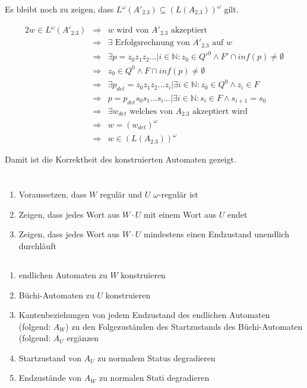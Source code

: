 \documentclass[10pt,a4paper,oneside,ngerman,numbers=noenddot]{scrartcl}
\begin{document}
	Es bleibt noch zu zeigen, dass \(L^{\omega}(A'_{2.3}) \subseteq (L(A_{2.3}))^{\omega}\) gilt.
	
	\begin{alignat*}{2}
		w \in L^{\omega}(A'_{2.3}) &\Rightarrow & w \text{ wird von \(A'_{2.3}\) akzeptiert} \\
									&\Rightarrow & \exists \text{ Erfolgsrechnung von \(A'_{2.3}\) auf \(w\)} \\
									&\Rightarrow & \exists p = z_{0}z_{1}z_{2}... | i \in \mathbb{N} : z_{0} \in Q'^{0} \wedge F' \cap inf(p) \neq \emptyset \\
									&\Rightarrow & z_{0} \in Q^{0} \wedge F \cap inf(p) \neq \emptyset \\
									&\Rightarrow & \exists p_{det} = z_{0}z_{1}z_{2}...z_{i} | \exists i \in \mathbb{N} : z_{0} \in Q^{0} \wedge z_{i} \in F \\
									&\Rightarrow & p = p_{det}s_{0}s_{1}...s_{i}... | \exists i \in \mathbb{N} : s_{i} \in F \wedge s_{i+1} = s_{0} \\
									&\Rightarrow & \exists w_{det} \text{ welches von \(A_{2.3}\) akzeptiert wird} \\
									&\Rightarrow & w = (w_{det})^{\omega} \\
									&\Rightarrow & w \in (L(A_{2.3}))^{\omega}
	\end{alignat*}
	
	Damit ist die Korrektheit des konstruierten Automaten gezeigt.
	
\section{} %
	\subsection{} %
		\begin{enumerate}
			\item Voraussetzen, dass \(W\) regulär und \(U\) \(\omega\)-regulär ist
			\item Zeigen, dass jedes Wort aus \(W \cdot U\) mit einem Wort aus \(U\) endet
			\item Zeigen, dass jedes Wort aus \(W \cdot U\) mindestens einen Endzustand unendlich durchläuft
		\end{enumerate}
	\subsection{} %
		\begin{enumerate}
			\item endlichen Automaten zu \(W\) konstruieren
			\item Büchi-Automaten zu \(U\) konstruieren
			\item Kantenbeziehungen von jedem Endzustand des endlichen Automaten (folgend: \(A_{W}\)) zu den Folgezuständen des Startzustands des Büchi-Automaten (folgend: \(A_{U}\) ergänzen
			\item Startzustand von \(A_{U}\) zu normalem Status degradieren
			\item Endzustände von \(A_{W}\) zu normalen Stati degradieren
		\end{enumerate}
\end{document}

